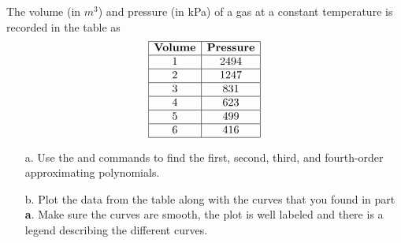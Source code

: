 {The volume (in $m^3$) and pressure (in kPa) of a gas at a constant temperature is recorded in the table as
\[
\begin{array}{|c|c|}
\hline
{\bf Volume} & {\bf Pressure} \\ \hline
1&	2494\\ \hline
2&	1247\\ \hline
3&	831\\ \hline
4&	623\\ \hline
5&	499\\ \hline
6&	416\\
\hline
\end{array}
\]
\begin{enumerate}
\item[a.] Use the  and  commands to find the first, second, third, and fourth-order approximating polynomials.
\item[b.] Plot the data from the table along with the curves that you found in part {\bf a}.  Make sure the curves are smooth, the plot is well labeled and there is a legend describing the different curves.
\end{enumerate}}
{}